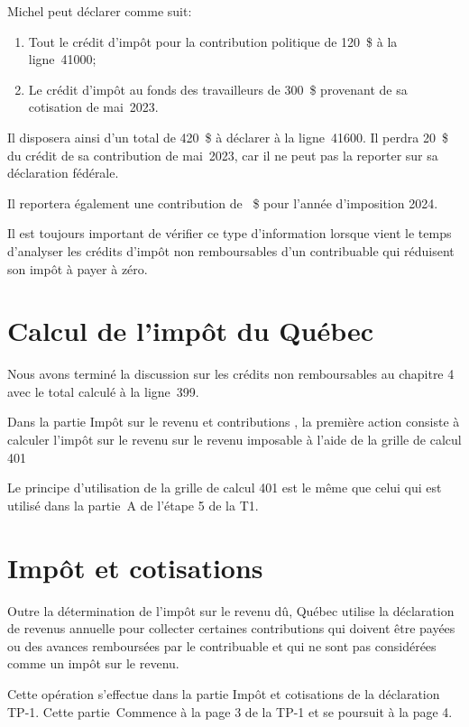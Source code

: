 Michel peut déclarer comme suit:
\begin{enumerate}
	\item Tout le crédit d'impôt pour la contribution politique de 120~\$ à la ligne~41000;
	\item Le crédit d'impôt au fonds des travailleurs de 300~\$ provenant de sa cotisation de mai~2023.
\end{enumerate}

Il disposera ainsi d'un total de 420~\$ à déclarer à la ligne~41600. Il perdra 20~\$ du crédit de sa contribution de mai~2023, car il ne peut pas la reporter sur sa déclaration fédérale.

Il reportera également une contribution de ~\$ pour l'année d'imposition 2024.

Il est toujours important de vérifier ce type d'information lorsque vient le temps d'analyser les crédits d'impôt non remboursables d'un contribuable qui réduisent son impôt à payer à zéro.



\section{Calcul de l'impôt du Québec}
\begin{intro}
	Nous avons terminé la discussion sur les crédits non remboursables au chapitre 4 avec le total calculé à la ligne~399.
	
	Dans la partie Impôt sur le revenu et contributions , la première action consiste à calculer l'impôt sur le revenu sur le revenu imposable à l'aide de la grille de calcul 401
\end{intro}
Le principe d'utilisation de la grille de calcul 401 est le même que celui qui est utilisé dans la partie~A de l'étape 5 de  la T1. 



\section{Impôt et cotisations}
\begin{intro}
	Outre la détermination de l'impôt sur le revenu dû, Québec utilise la déclaration de revenus annuelle pour collecter certaines \og contributions \fg{} qui doivent être payées ou des \og avances\fg{} remboursées par le contribuable et qui ne sont pas considérées comme un impôt sur le revenu.
	
	Cette opération s'effectue dans la partie \og Impôt et cotisations \fg{} de la déclaration TP-1. Cette partie~Commence à la page 3 de la TP-1 et se poursuit à la page 4.
\end{intro}

